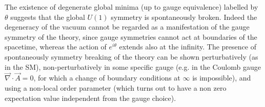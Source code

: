 \documentclass[../main/main.tex]{subfiles}
\begin{document}

The existence of degenerate global minima (up to gauge equivalence) labelled by $\theta$ suggests that the global $U(1)$ symmetry is spontaneously broken. Indeed the degeneracy of the vacuum cannot be regarded as a manifestation of the gauge symmetry of the theory, since gauge symmetries cannot act at boundaries of the spacetime, whereas the action of $e^{i\theta}$ extends also at the infinity.
The presence of spontaneously symmetry breaking of the theory can be shown perturbatively (as in the SM), non-perturbatively in some specific gauge (e.g. in the Coulomb gauge $\vec\nabla\cdot\vec A=0$, for which a change of boundary conditions at $\infty$ is impossible), and using a non-local order parameter (which turns out to have a non zero expectation value independent from the gauge choice). 
\end{document}
